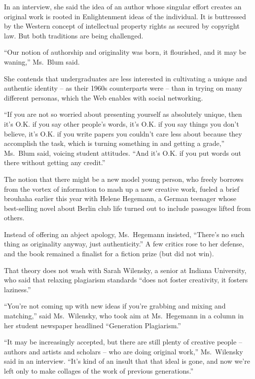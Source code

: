 ﻿\documentclass[12pt]{article}
\begin{document}
In an interview, she said the idea of an author whose singular effort creates an original work is
rooted in Enlightenment ideas of the individual. It is buttressed by the Western concept of
intellectual property rights as secured by copyright law. But both traditions are being challenged.

``Our notion of authorship and originality was born, it flourished, and it may be waning,'' Ms.~Blum
said.

She contends that undergraduates are less interested in cultivating a unique and authentic identity
-- as their 1960s counterparts were -- than in trying on many different personas, which the Web
enables with social networking.

``If you are not so worried about presenting yourself as absolutely unique, then it's O.K. if you
say other people's words, it's O.K. if you say things you don't believe, it's O.K. if you write
papers you couldn't care less about because they accomplish the task, which is turning something in
and getting a grade,'' Ms.~Blum said, voicing student attitudes. ``And it's O.K. if you put words
out there without getting any credit.''

The notion that there might be a new model young person, who freely borrows from the vortex of
information to mash up a new creative work, fueled a brief brouhaha earlier this year with Helene
Hegemann, a German teenager whose best-selling novel about Berlin club life turned out to include
passages lifted from others.

Instead of offering an abject apology, Ms.~Hegemann insisted, ``There's no such thing as originality
anyway, just authenticity.'' A few critics rose to her defense, and the book remained a finalist for
a fiction prize (but did not win).

That theory does not wash with Sarah Wilensky, a senior at Indiana University, who said that
relaxing plagiarism standards ``does not foster creativity, it fosters laziness.''

``You're not coming up with new ideas if you're grabbing and mixing and matching,'' said
Ms.~Wilensky, who took aim at Ms.~Hegemann in a column in her student newspaper headlined
``Generation Plagiarism.''

``It may be increasingly accepted, but there are still plenty of creative people -- authors and
artists and scholars -- who are doing original work,'' Ms.~Wilensky said in an interview. ``It's
kind of an insult that that ideal is gone, and now we're left only to make collages of the work of
previous generations.''
\end{document}
